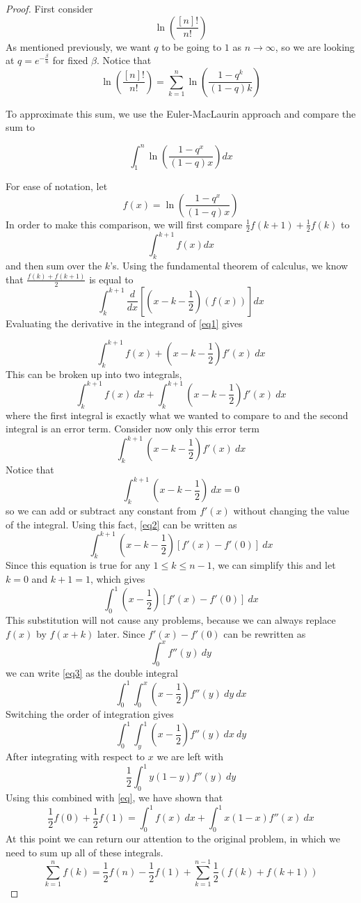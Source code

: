 \documentclass[12pt]{report}
\theoremstyle{definition}
\begin{document}
\begin{proof}
First consider \[\ln\left(\frac{[n]!}{n!}\right)\] As mentioned previously, we want $q$ to be going to $1$ as $n\rightarrow\infty$, so we are looking at $q=e^{-\frac{\beta}{n}}$ for fixed $\beta$.  Notice that \[\ln\left(\frac{[n]!}{n!}\right)=\sum_{k=1}^n \ln\left(\frac{1-q^k}{(1-q)k}\right)\]  

To approximate this sum, we use the Euler-MacLaurin approach and compare the sum to

 \[\int_1^n \ln\left(\frac{1-q^x}{(1-q)x}\right)dx\]

For ease of notation, let \[f(x)=\ln\left(\frac{1-q^x}{(1-q)x}\right)\]
In order to make this comparison, we will first compare 
$\frac{1}{2}f(k+1)+\frac{1}{2}f(k)$ to \[ \int_k^{k+1} f(x)dx\] and then sum over the $k$'s.   Using the fundamental theorem of calculus, we know that $\frac{f(k)+f(k+1)}{2}$ is equal to \begin{equation}\label{eq1} \int_k^{k+1}\frac{d}{dx}\left[(x-k-\frac{1}{2})(f(x))\right]dx \end{equation}  Evaluating the derivative in the integrand of \ref{eq1} gives 

\begin{equation}\label{eq} \int_k^{k+1}f(x)+\left (x-k-\frac{1}{2}\right)f'(x) \:dx\end{equation} This can be broken up into two integrals, \[\int_k^{k+1}f(x)\:dx+\int_k^{k+1}  \left(x-k-\frac{1}{2}\right)f'(x)\: dx\]where the first integral is exactly what we wanted to compare to and the second integral is an error term.  Consider now only this error term \begin{equation}\label{eq2}\int_k^{k+1} \left(x-k-\frac{1}{2}\right)f'(x)\:dx\end{equation}Notice that \[\int_k^{k+1} \left(x-k-\frac{1}{2}\right)\:dx=0\]so we can add or subtract any constant from $f'(x)$ without changing the value of the integral.  Using this fact, \ref{eq2} can be written as \[\int_k^{k+1}\left(x-k-\frac{1}{2}\right)[f'(x)-f'(0)]\:dx\]  Since this equation is true for any $1\leq k\leq n-1$, we can simplify this and let $k=0$ and $k+1=1$, which gives \begin{equation}\label{eq3}\int_0^1\left(x-\frac{1}{2}\right)[f'(x)-f'(0)]\:dx\end{equation}This substitution will not cause any problems, because we can always replace $f(x)$ by $f(x+k)$ later. Since $f'(x)-f'(0)$ can be rewritten as \[\int_0^x f''(y)\:dy\] we can write \ref{eq3} as the double integral \[\int_0^1\int_0^x \left(x-\frac{1}{2}\right)f''(y)\:dy\:dx\]Switching the order of integration gives \[\int_0^1\int_y^1 \left(x-\frac{1}{2}\right)f''(y)\:dx\:dy\]
After integrating with respect to $x$ we are left with
 \[
\frac{1}{2}\int_0^1 y(1-y)f''(y)\:dy
\]
Using this combined with \ref{eq}, we have shown that \[\frac{1}{2}f(0)+\frac{1}{2}f(1)=\int_0^1 f(x)\:dx+\int_0^1 x(1-x)f''(x)\:dx\]At this point we can return our attention to the original problem, in which we need to sum up all of these integrals.  \begin{equation}\label{result}\sum_{k=1}^n f(k)=\frac{1}{2}f(n)-\frac{1}{2}f(1)+\sum_{k=1}^{n-1}\frac{1}{2}(f(k)+f(k+1))\end{equation}


\end{proof}
\end{document}

